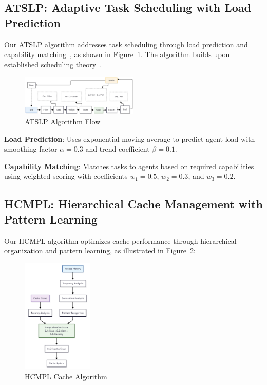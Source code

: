 \documentclass[conference]{IEEEtran}
\begin{document}
\subsection{ATSLP: Adaptive Task Scheduling with Load Prediction}

Our ATSLP algorithm addresses task scheduling through load prediction and capability matching~\cite{kleinberg2006algorithm}, as shown in Figure~\ref{fig:atslp}. The algorithm builds upon established scheduling theory~\cite{tanenbaum2016structured}.

\begin{figure}[htbp]
\centering
\includegraphics[width=0.5\textwidth]{figures/images/awrr_algorithm_flow.png}
\caption{ATSLP Algorithm Flow}
\label{fig:atslp}
\end{figure}

\textbf{Load Prediction}: Uses exponential moving average to predict agent load with smoothing factor $\alpha = 0.3$ and trend coefficient $\beta = 0.1$.

\textbf{Capability Matching}: Matches tasks to agents based on required capabilities using weighted scoring with coefficients $w_1 = 0.5$, $w_2 = 0.3$, and $w_3 = 0.2$.

\subsection{HCMPL: Hierarchical Cache Management with Pattern Learning}

Our HCMPL algorithm optimizes cache performance through hierarchical organization and pattern learning, as illustrated in Figure~\ref{fig:hcmpl}:

\begin{figure}[htbp]
\centering
\includegraphics[width=0.3\textwidth]{figures/images/paac_cache_algorithm.png}
\caption{HCMPL Cache Algorithm}
\label{fig:hcmpl}
\end{figure}
\end{document}
